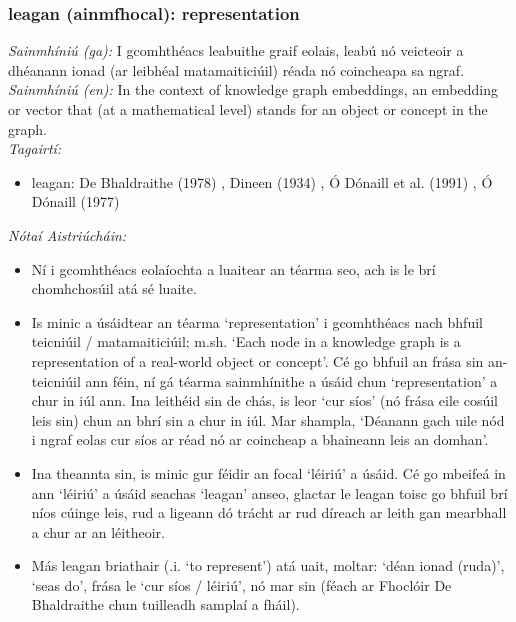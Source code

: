 \subsubsection*{leagan (ainmfhocal): representation}
 \noindent \textit{Sainmhíniú (ga):} I gcomhthéacs leabuithe graif eolais, leabú nó veicteoir a dhéanann ionad (ar leibhéal matamaiticiúil) réada nó coincheapa sa ngraf.
\\
 \noindent \textit{Sainmhíniú (en):} In the context of knowledge graph embeddings, an embedding or vector that (at a mathematical level) stands for an object or concept in the graph.
\\
 \noindent \textit{Tagairtí:}
\begin{itemize}
	\item leagan: De Bhaldraithe (1978) \cite{de-bhaldraithe}, Dineen (1934) \cite{dineen}, Ó Dónaill et al. (1991) \cite{focloir-beag}, Ó Dónaill (1977) \cite{odonaill}
\end{itemize}

 \noindent \textit{Nótaí Aistriúcháin:}
\begin{itemize}
	\item Ní i gcomhthéacs eolaíochta a luaitear an téarma seo, ach is le brí chomhchosúil atá sé luaite.
	\item Is minic a úsáidtear an téarma `representation' i gcomhthéacs nach bhfuil teicniúil / matamaiticiúil; m.sh. `Each node in a knowledge graph is a representation of a real-world object or concept'. Cé go bhfuil an frása sin an-teicniúil ann féin, ní gá téarma sainmhínithe a úsáid chun `representation' a chur in iúl ann. Ina leithéid sin de chás, is leor `cur síos' (nó frása eile cosúil leis sin) chun an bhrí sin a chur in iúl. Mar shampla, `Déanann gach uile nód i ngraf eolas cur síos ar réad nó ar coincheap a bhaineann leis an domhan'.
	\item Ina theannta sin, is minic gur féidir an focal `léiriú' a úsáid. Cé go mbeifeá in ann `léiriú' a úsáid seachas `leagan' anseo, glactar le leagan toisc go bhfuil brí níos cúinge leis, rud a ligeann dó trácht ar rud díreach ar leith gan mearbhall a chur ar an léitheoir.
	\item Más leagan briathair (.i. `to represent') atá uait, moltar: `déan ionad (ruda)', `seas do', frása le `cur síos / léiriú', nó mar sin (féach ar Fhoclóir De Bhaldraithe chun tuilleadh samplaí a fháil).
\end{itemize}


